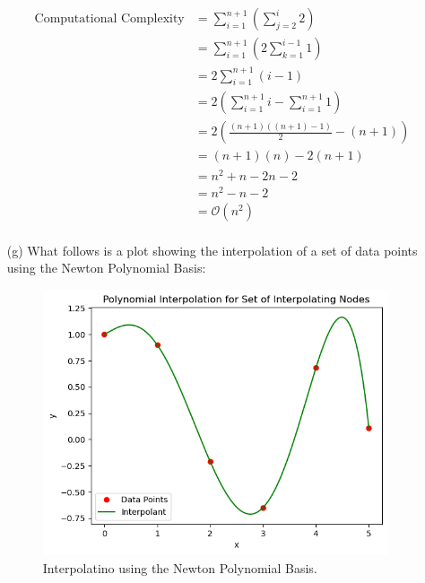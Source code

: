 \documentclass{article}
\begin{document}
\begin{enumerate}
                \begin{align*}
                    \text{Computational Complexity} &= \sum_{i=1}^{n+1} \left(\sum_{j=2}^{i}2 \right)\\
                                                    &= \sum_{i=1}^{n+1} \left(2\sum_{k=1}^{i-1}1 \right)\\
                                                    &= 2\sum_{i=1}^{n+1} (i-1)\\
                                                    &= 2\left(\sum_{i=1}^{n+1}i-\sum_{i=1}^{n+1}1 \right)\\
                                                    &= 2\left( \frac{(n+1)((n+1)-1)}{2}-(n+1) \right)\\
                                                    &= (n+1)(n)-2(n+1)\\
                                                    &= n^{2}+n-2n-2\\
                                                    &= n^{2}-n-2\\
                                                    &= \mathcal{O}(n^{2})\\                                     
                \end{align*}
    
    \item[(g)]  What follows is a plot showing the interpolation of a set of data points using the Newton Polynomial Basis:
                \begin{figure}[h]
                    \centering
                    \includegraphics[width=4in]{./Quest3e.png}
                    \caption{Interpolatino using the Newton Polynomial Basis.}
                    \label{fig:image4}
                \end{figure}

\end{enumerate}
\end{document}
